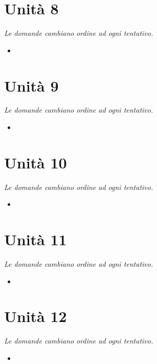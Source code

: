 \documentclass[12pt, a4paper]{report}
\begin{document}
\chapter{Unità 8}
    \textit{Le domande cambiano ordine ad ogni tentativo.}
    \begin{itemize}
        \item 
    \end{itemize}
\chapter{Unità 9}
    \textit{Le domande cambiano ordine ad ogni tentativo.}
    \begin{itemize}
        \item 
    \end{itemize}
\chapter{Unità 10}
    \textit{Le domande cambiano ordine ad ogni tentativo.}
    \begin{itemize}
        \item 
    \end{itemize}
\chapter{Unità 11}
    \textit{Le domande cambiano ordine ad ogni tentativo.}
    \begin{itemize}
        \item 
    \end{itemize}
\chapter{Unità 12}
    \textit{Le domande cambiano ordine ad ogni tentativo.}
    \begin{itemize}
        \item 
    \end{itemize}
\end{document}
